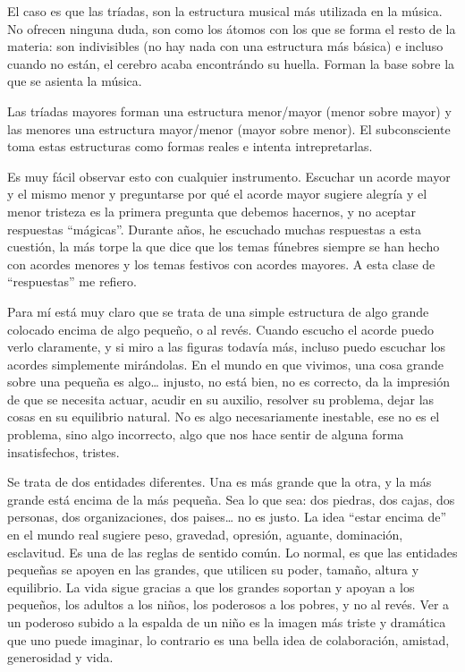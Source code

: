 \documentclass[]{report}
\begin{document}
El caso es que las tríadas, son la estructura musical más utilizada en la música. No ofrecen ninguna duda, son como los átomos con los que se forma el resto de la materia: son indivisibles (no hay nada con una estructura más básica) e incluso cuando no están, el cerebro acaba encontrándo su huella. Forman la base sobre la que se asienta la música.

Las tríadas mayores forman una estructura menor/mayor (menor sobre mayor) y las menores una estructura mayor/menor (mayor sobre menor). El subconsciente toma estas estructuras como formas reales e intenta intrepretarlas.

Es muy fácil observar esto con cualquier instrumento. Escuchar un acorde mayor y el mismo menor y preguntarse por qué el acorde mayor sugiere alegría y el menor tristeza es la primera pregunta que debemos hacernos, y no aceptar respuestas ``mágicas''. Durante años, he escuchado muchas respuestas a esta cuestión, la más torpe la que dice que los temas fúnebres siempre se han hecho con acordes menores y los temas festivos con acordes mayores. A esta clase de ``respuestas'' me refiero.

Para mí está muy claro que se trata de una simple estructura de algo grande colocado encima de algo pequeño, o al revés. Cuando escucho el acorde puedo verlo claramente, y si miro a las figuras todavía más, incluso puedo escuchar los acordes simplemente mirándolas. En el mundo en que vivimos, una cosa grande sobre una pequeña es algo\ldots{} injusto, no está bien, no es correcto, da la impresión de que se necesita actuar, acudir en su auxilio, resolver su problema, dejar las cosas en su equilibrio natural. No es algo necesariamente inestable, ese no es el problema, sino algo incorrecto, algo que nos hace sentir de alguna forma insatisfechos, tristes.

Se trata de dos entidades diferentes. Una es más grande que la otra, y la más grande está encima de la más pequeña. Sea lo que sea: dos piedras, dos cajas, dos personas, dos organizaciones, dos paises\ldots{} no es justo. La idea ``estar encima de'' en el mundo real sugiere peso, gravedad, opresión, aguante, dominación, esclavitud. Es una de las reglas de sentido común. Lo normal, es que las entidades pequeñas se apoyen en las grandes, que utilicen su poder, tamaño, altura y equilibrio. La vida sigue gracias a que los grandes soportan y apoyan a los pequeños, los adultos a los niños, los poderosos a los pobres, y no al revés. Ver a un poderoso subido a la espalda de un niño es la imagen más triste y dramática que uno puede imaginar, lo contrario es una bella idea de colaboración, amistad, generosidad y vida.
\end{document}
